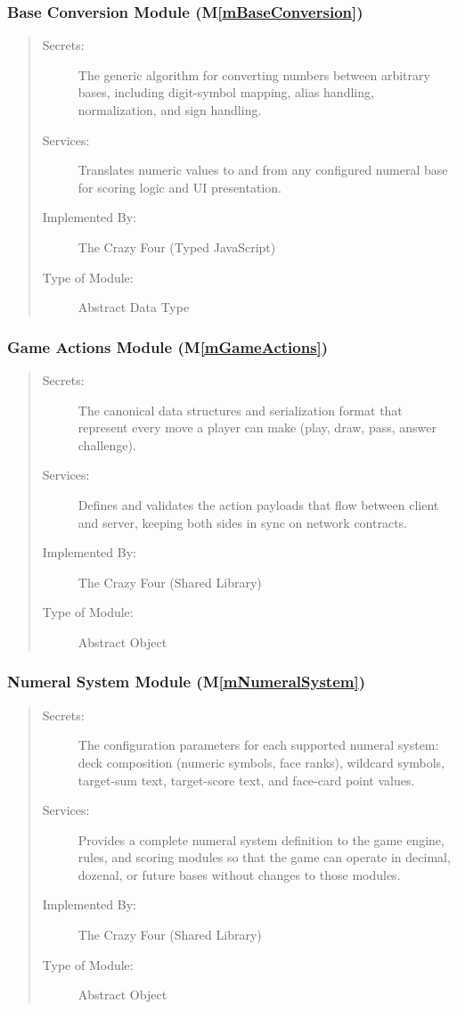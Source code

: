 \documentclass[12pt, titlepage]{article}
\newcommand{\mref}[1]{M\ref{#1}}
\begin{document}
\subsubsection{Base Conversion Module (\mref{mBaseConversion})}
\begin{quote}
\begin{description}
  \item[Secrets:] The generic algorithm for converting numbers between arbitrary bases, including digit-symbol mapping, alias handling, normalization, and sign handling.
  \item[Services:] Translates numeric values to and from any configured numeral base for scoring logic and UI presentation.
  \item[Implemented By:] The Crazy Four (Typed JavaScript)
  \item[Type of Module:] Abstract Data Type
\end{description}
\end{quote}

\subsubsection{Game Actions Module (\mref{mGameActions})}
\begin{quote}
\begin{description}
  \item[Secrets:] The canonical data structures and serialization format that represent every move a player can make (play, draw, pass, answer challenge).
  \item[Services:] Defines and validates the action payloads that flow between client and server, keeping both sides in sync on network contracts.
  \item[Implemented By:] The Crazy Four (Shared Library)
  \item[Type of Module:] Abstract Object
\end{description}
\end{quote}

\subsubsection{Numeral System Module (\mref{mNumeralSystem})}
\begin{quote}
\begin{description}
  \item[Secrets:] The configuration parameters for each supported numeral system: deck composition (numeric symbols, face ranks), wildcard symbols, target-sum text, target-score text, and face-card point values.
  \item[Services:] Provides a complete numeral system definition to the game engine, rules, and scoring modules so that the game can operate in decimal, dozenal, or future bases without changes to those modules.
  \item[Implemented By:] The Crazy Four (Shared Library)
  \item[Type of Module:] Abstract Object
\end{description}
\end{quote}
\end{document}
